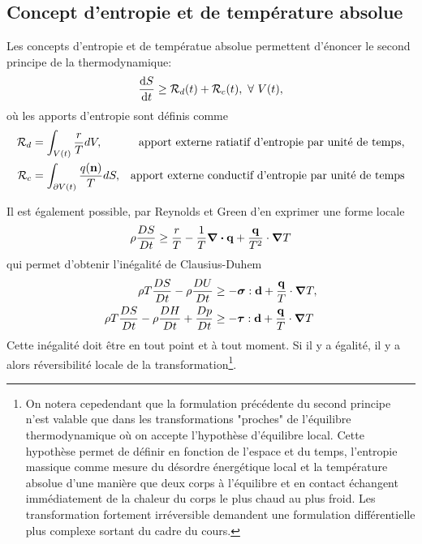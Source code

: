     \subsection{Concept d'entropie et de température absolue}
      Les concepts d'entropie et de températue absolue permettent d'énoncer le second principe de la thermodynamique:
      \begin{equation}
        \dv{S}{t} \geq \mathcal{R}_d(t) + \mathcal{R}_c(t),~\forall~V(t),
      \end{equation}
     où les apports d'entropie sont définis comme
     \begin{align*}
       \mathcal{R}_d &= \int_{V(t)} \frac{r}{T} dV, & \textrm{apport externe ratiatif d'entropie par unité de temps,}\\
       \mathcal{R}_c &= \int_{\partial V(t)} \frac{q(\vb{n})}{T}dS, & \textrm{apport externe conductif d'entropie par unité de temps}
     \end{align*}

     Il est également possible, par Reynolds et Green d'en exprimer une forme locale
     \begin{equation}
       \rho \frac{D S}{D t} \geq \frac{r}{T} - \frac{1}{T}\div \vb{q} + \frac{\vb{q}}{T^2} \cdot \grad T
     \end{equation}
     qui permet d'obtenir l'inégalité de Clausius-Duhem
     \begin{equation}
       \begin{aligned}
         \rho T \frac{D S}{D t} - \rho \frac{D U}{D t} &\geq - \boldsymbol{\sigma} : \vb{d} + \frac{\vb{q}}{T} \cdot \grad T,\\
         \rho T \frac{D S}{D t} - \rho \frac{D H}{D t} + \frac{D p}{D t} &\geq - \boldsymbol{\tau} : \vb{d} + \frac{\vb{q}}{T} \cdot \grad T
       \end{aligned}
     \end{equation}
     Cette inégalité doit être en tout point et à tout moment. Si il y a égalité, il y a alors réversibilité locale de la transformation\footnote{On notera cepedendant que la formulation précédente du second principe n'est valable que dans les transformations "proches" de l'équilibre thermodynamique où on accepte l'hypothèse d'équilibre local. Cette hypothèse permet de définir en fonction de l'espace et du temps, l'entropie massique comme mesure du désordre énergétique local et la température absolue d'une manière que deux corps à l'équilibre et en contact échangent immédiatement de la chaleur du corps le plus chaud au plus froid. Les transformation fortement irréversible demandent une formulation différentielle plus complexe sortant du cadre du cours.}.

